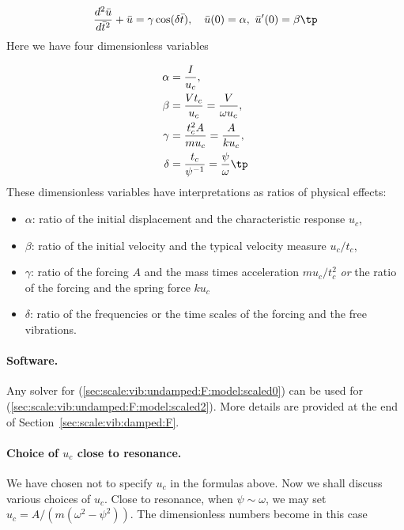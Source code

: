 \documentclass[graybox,envcountchap,sectrefs,final]{svmonodo}
\begin{document}
\begin{equation}
\frac{d^2\bar u}{d\bar t^2} + \bar u =
\gamma
\cos(\delta\bar t),
\quad \bar u(0)=\alpha,\ \bar u'(0)=\beta\tp
\label{sec:scale:vib:undamped:F:model:scaled2}
\end{equation}
Here we have four dimensionless variables

\begin{align}
\alpha &= \frac{I}{u_c},\\ 
\beta  &= \frac{Vt_c}{u_c} = \frac{V}{\omega u_c},\\ 
\gamma &= \frac{t_c^2 A}{mu_c} = \frac{A}{ku_c},\\ 
\delta &= \frac{t_c}{\psi^{-1}} = \frac{\psi}{\omega}\tp
\end{align}
These dimensionless variables have interpretations as ratios of
physical effects:

\begin{itemize}
 \item $\alpha$: ratio of the initial displacement and
   the characteristic response $u_c$,

 \item $\beta$: ratio of the initial velocity
   and the typical velocity measure $u_c/t_c$,

 \item $\gamma$: ratio of
   the forcing $A$ and the mass times acceleration $mu_c/t_c^2$ \emph{or}
   the ratio of the forcing and the spring force $ku_c$

 \item $\delta$: ratio of the
   frequencies or the time scales of the forcing and the free vibrations.
\end{itemize}

\noindent
\paragraph{Software.}
Any solver for (\ref{sec:scale:vib:undamped:F:model:scaled0})
can be used for (\ref{sec:scale:vib:undamped:F:model:scaled2}).
More details are provided at the end of
Section~\ref{sec:scale:vib:damped:F}.

\paragraph{Choice of $u_c$ close to resonance.}
We have chosen not to specify $u_c$ in the formulas above. Now we shall
discuss various choices of $u_c$.
Close to resonance, when $\psi\sim\omega$, we may set
$u_c=A/(m(\omega^2 - \psi^2))$. The dimensionless numbers
become in this case
\end{document}
